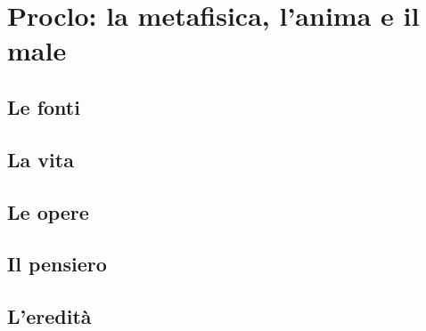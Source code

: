 \chapter{Proclo: la metafisica, l'anima e il male}

\section{Le fonti}

\section{La vita}

\section{Le opere}

\section{Il pensiero}

\section{L'eredità}
